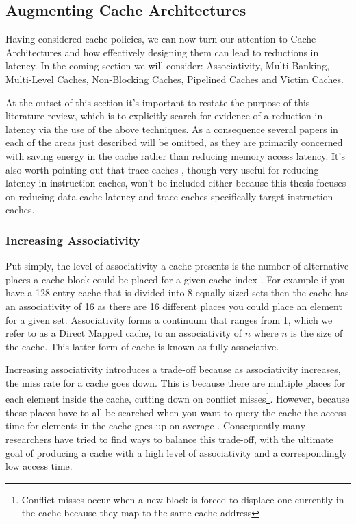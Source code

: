 \subsection{Augmenting Cache Architectures}
Having considered cache policies, we can now turn our attention to Cache Architectures and how effectively designing them can lead to reductions in latency. In the coming section we will consider: Associativity, Multi-Banking, Multi-Level Caches, Non-Blocking Caches, Pipelined Caches and Victim Caches. 

At the outset of this section it's important to restate the purpose of this literature review, which is to explicitly search for evidence of a reduction in latency via the use of the above techniques. As a consequence several papers in each of the areas just described will be omitted, as they are primarily concerned with saving energy in the cache rather than reducing memory access latency. It's also worth pointing out that trace caches \cite{rotenbergTraceCacheMicroarchitecture1999, ramirezTraceCacheRedundancy2000} , though very useful for reducing latency in instruction caches, won't be included either because this thesis focuses on reducing data cache latency and trace caches specifically target instruction caches.

\subsubsection{Increasing Associativity}

Put simply, the level of associativity a cache presents is the number of alternative places a cache block could be placed for a given cache index \cite{pachecoParallelHardwareParallel2011}. For example if you have a 128 entry cache that is divided into 8 equally sized sets then the cache has an associativity of 16 as there are 16 different places you could place an element for a given set. Associativity forms a continuum that ranges from 1, which we refer to as a Direct Mapped cache, to an associativity of $n$ where $n$ is the size of the cache. This latter form of cache is known as fully associative. 

Increasing associativity introduces a trade-off because as associativity increases, the miss rate for a cache goes down. This is because there are multiple places for each element inside the cache, cutting down on conflict misses\footnote{Conflict misses occur when a new block is forced to displace one currently in the cache because they map to the same cache address}. However, because these places have to all be searched when you want to query the cache the access time for elements in the cache goes up on average \cite{kesslerInexpensiveImplementationsSetAssociativity1989}. Consequently many researchers have tried to find ways to balance this trade-off, with the ultimate goal of producing a cache with a high level of associativity and a correspondingly low access time. 

